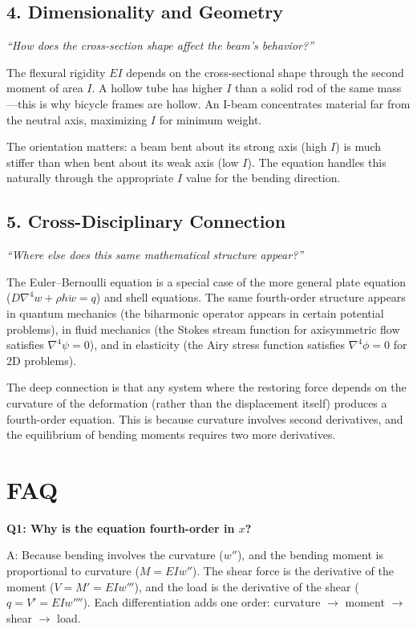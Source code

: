 \documentclass[11pt,openright]{book}
\begin{document}
\subsection*{4. Dimensionality and Geometry}
\textit{``How does the cross-section shape affect the beam's behavior?''}

The flexural rigidity $EI$ depends on the cross-sectional shape through the second moment of area $I$. A hollow tube has higher $I$ than a solid rod of the same mass---this is why bicycle frames are hollow. An I-beam concentrates material far from the neutral axis, maximizing $I$ for minimum weight.

The orientation matters: a beam bent about its strong axis (high $I$) is much stiffer than when bent about its weak axis (low $I$). The equation handles this naturally through the appropriate $I$ value for the bending direction.

\subsection*{5. Cross-Disciplinary Connection}
\textit{``Where else does this same mathematical structure appear?''}

The Euler--Bernoulli equation is a special case of the more general plate equation ($D\nabla^4 w + \rho h \ddot{w} = q$) and shell equations. The same fourth-order structure appears in quantum mechanics (the biharmonic operator appears in certain potential problems), in fluid mechanics (the Stokes stream function for axisymmetric flow satisfies $\nabla^4 \psi = 0$), and in elasticity (the Airy stress function satisfies $\nabla^4 \phi = 0$ for 2D problems).

The deep connection is that any system where the restoring force depends on the curvature of the deformation (rather than the displacement itself) produces a fourth-order equation. This is because curvature involves second derivatives, and the equilibrium of bending moments requires two more derivatives.


\section*{FAQ}

\textbf{Q1: Why is the equation fourth-order in $x$?}

A: Because bending involves the curvature ($w''$), and the bending moment is proportional to curvature ($M = EIw''$). The shear force is the derivative of the moment ($V = M' = EIw'''$), and the load is the derivative of the shear ($q = V' = EIw''''$). Each differentiation adds one order: curvature $\to$ moment $\to$ shear $\to$ load.
\end{document}
